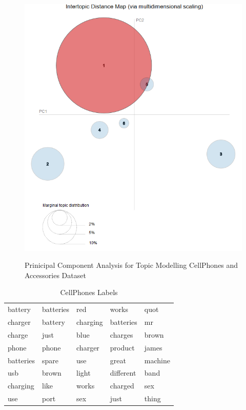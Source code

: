 \begin{figure}[H]
  {\includegraphics[width = 0.85 \textwidth]{img/lda/3.PNG}}
  \caption{Prinicipal Component Analysis for Topic Modelling CellPhones and Accessories Dataset}
\end{figure}


\begin{table}[h]
\centering
\begin{tabular}{ lllll }
\midrule
battery & batteries & red   & works  & quot  \\
charger & battery & charging & batteries  & mr  \\
charge & just   & blue  & charges     & brown  \\ 
phone & phone  &  charger  & product    & james  \\ 
batteries  & spare & use  & great   & machine \\ 
usb & brown & light & different  & band  \\ 
charging & like  &  works & charged  &  sex \\ 
use & port & sex & just &  thing  \\ 
\bottomrule          
\end{tabular}
\caption{CellPhones Labels}
\label{Cellphones Labels}
\end{table}

